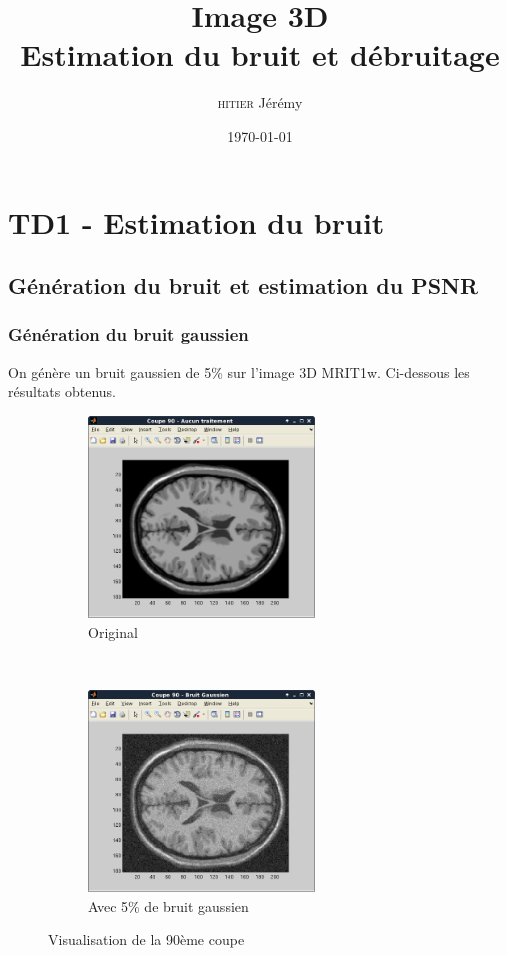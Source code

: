 \documentclass{report}
\title{Image 3D \\Estimation du bruit et débruitage}
\author{\textsc{hitier} Jérémy}
\date{\today}
\begin{document}
\maketitle
\tableofcontents
\newpage
\newpage

\chapter{TD1 - Estimation du bruit}
\section{Génération du bruit et estimation du PSNR}
\subsection{Génération du bruit gaussien}

On génère un bruit gaussien de 5\% sur l'image 3D MRIT1w. Ci-dessous les résultats obtenus.
\begin{figure}[h]
\centering
	\begin{subfigure}[b]{0.4\textwidth}
	\centering
	\includegraphics[width = 6cm]{coupe90.png}
	\caption{Original}
	\end{subfigure}
	~
	\begin{subfigure}[b]{0.4\textwidth}
	\centering
	\includegraphics[width = 6cm]{coupe90Gauss.png}
	\caption{Avec 5\% de bruit gaussien}
	\end{subfigure}
	\caption{Visualisation de la 90ème coupe}
\end{figure}
\newpage
\end{document}
